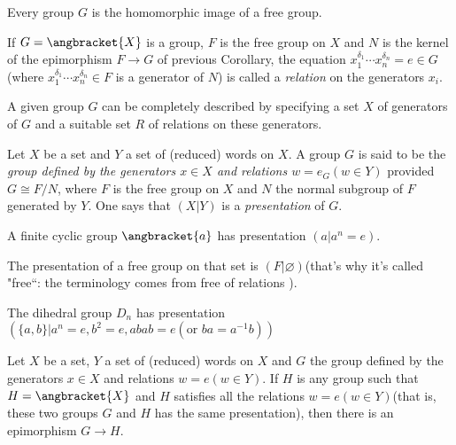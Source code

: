 \begin{Corollary}
	Every group $ G $ is the homomorphic image of a free group.
\end{Corollary}

\begin{definition}
	If $ G=\angbracket{X} $ is a group, $ F $ is the free group on $ X $ and $ N $ is the kernel of the epimorphism $ F \to G $ of previous Corollary, the equation $ x_1^{\delta_1}\cdots x_n^{\delta_n}=e \in G $(where $ x_1^{\delta_1}\cdots x_n^{\delta_n} \in F$ is a generator of $ N $) is called a \textit{relation} on the generators $ x_i $.
\end{definition}
A given group $ G $ can be completely described by specifying a set $ X $ of generators of $ G $ and a suitable set $ R $ of relations on these generators.
\begin{definition}
	Let $ X $ be a set and $ Y $ a set of (reduced) words on $ X $. A group $ G $ is said to be the \textit{group defined by the generators $ x \in X $ and relations $ w =e_G (w \in Y) $} provided $ G \cong F/N $, where $ F $ is the free group on $ X $ and $ N $ the normal subgroup of $ F $ generated by $ Y $. One says that $ (X|Y) $ is a \textit{presentation} of $ G $.
\end{definition}
\begin{Example}
	A finite cyclic group $ \angbracket{a} $ has presentation $ (a|a^n=e) $.
\end{Example}
\begin{Example}
	The presentation of a free group on that set is $(F|\varnothing) $(that's why it's called "free``: the terminology comes from free of relations ).
\end{Example}
\begin{Example}
	The dihedral group $ D_n $ has presentation $ (\{a,b \}|a^n=e, b^2=e,abab=e(\text{or } ba=a^{-1}b)) $
\end{Example}
\begin{theorem}
	Let $ X $ be a set, $ Y $ a set of (reduced) words on $ X $ and $ G $ the group defined by the generators $ x \in X $ and relations $ w = e(w \in Y) $. If $ H $ is any group such that $ H = \angbracket{X} $ and $ H $ satisfies all the relations $ w = e(w \in Y)  $(that is, these two groups $ G $ and $ H $ has the same presentation), then there is an epimorphism $ G \to H $.
\end{theorem}
